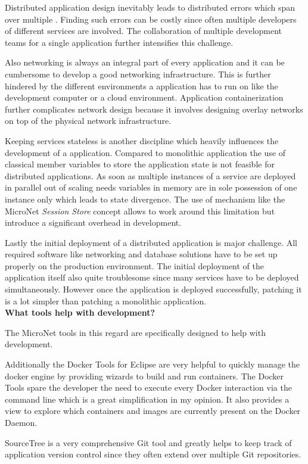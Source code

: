 Distributed application design inevitably leads to distributed errors which
span over multiple \mss{}. Finding such errors can be costly since often
multiple developers of different services are involved. The collaboration of
multiple development teams for a single application further intensifies this
challenge.

Also networking is always an integral part of every \ms{} application and it can
be cumbersome to develop a good networking infrastructure. This is further
hindered by the different environments a \ms{} application has to run on like
the development computer or a cloud environment. Application containerization
further complicates network design because it involves designing overlay
networks on top of the physical network infrastructure.

Keeping services stateless is another discipline which heavily influences the
development of a \ms{} application. Compared to monolithic application the use
of classical member variables to store the application state is not feasible for
distributed applications. As soon as multiple instances of a service are
deployed in parallel out of scaling needs variables in memory are in sole
possession of one instance only which leads to state divergence.  The use of
mechanism like the MicroNet \textit{Session Store} concept allows to work around
this limitation but introduce a significant overhead in development.

Lastly the initial deployment of a distributed application is major challenge.
All required software like networking and database solutions have to be set up
properly on the production environment. The initial deployment of the
application itself also quite troublesome since many services have to be
deployed simultaneously. However once the application is deployed successfully,
patching it is a lot simpler than patching a monolithic application.\\

\noindent
\textbf{What tools help with \ms{} development?}

The MicroNet tools in this regard are specifically designed to help with \ms{}
development. 

Additionally the Docker Tools for Eclipse are very helpful to quickly manage the
docker engine by providing wizards to build and run containers. The Docker Tools
spare the developer the need to execute every Docker interaction via the command
line which is a great simplification in my opinion. It also provides a view to
explore which containers and images are currently present on the Docker Daemon.

SourceTree is a very comprehensive Git tool and greatly helps to keep track of
\ms{} application version control since they often extend over multiple Git
repositories.

